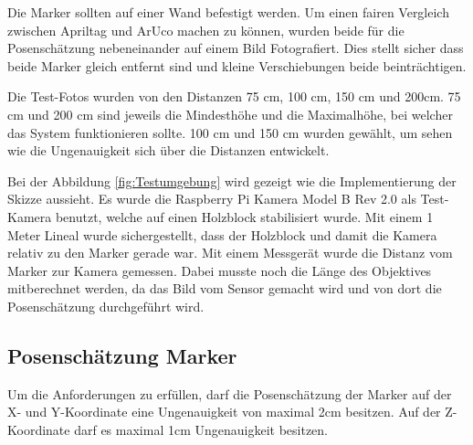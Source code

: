 Die Marker sollten auf einer Wand befestigt werden. 
Um einen fairen Vergleich zwischen Apriltag und ArUco machen zu können, wurden beide für die Posenschätzung nebeneinander auf einem Bild Fotografiert.
Dies stellt sicher dass beide Marker gleich entfernt sind und kleine Verschiebungen beide beinträchtigen.

Die Test-Fotos wurden von den Distanzen 75 cm, 100 cm, 150 cm und 200cm.
75 cm und 200 cm sind jeweils die Mindesthöhe und die Maximalhöhe, bei welcher das System funktionieren sollte.
100 cm und 150 cm wurden gewählt, um sehen wie die Ungenauigkeit sich über die Distanzen entwickelt.

Bei der Abbildung \ref{fig:Testumgebung} wird gezeigt wie die Implementierung der Skizze aussieht. 
Es wurde die Raspberry Pi Kamera Model B Rev 2.0 als Test-Kamera benutzt, welche auf einen Holzblock stabilisiert wurde.
Mit einem 1 Meter Lineal wurde sichergestellt, dass der Holzblock und damit die Kamera relativ zu den Marker gerade war.
Mit einem Messgerät wurde die Distanz vom Marker zur Kamera gemessen. 
Dabei musste noch die Länge des Objektives mitberechnet werden, da das Bild vom Sensor gemacht wird und von dort die Posenschätzung durchgeführt wird.

\subsection{Posenschätzung Marker}

Um die Anforderungen zu erfüllen, darf die Posenschätzung der Marker auf der X- und Y-Koordinate eine Ungenauigkeit von maximal 2cm besitzen. 
Auf der Z-Koordinate darf es maximal 1cm Ungenauigkeit besitzen.

